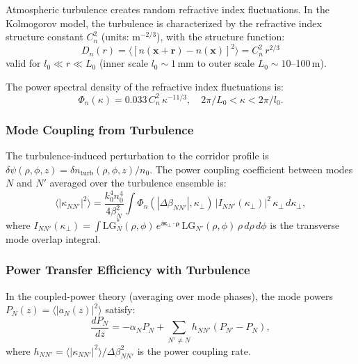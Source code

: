 \documentclass[journal,twocolumn]{IEEEtran}
\newcommand{\LG}{\mathrm{LG}}
\begin{document}
Atmospheric turbulence creates random refractive index fluctuations.
In the Kolmogorov model, the turbulence is characterized by the
refractive index structure constant $C_n^2$ (units: m$^{-2/3}$), with
the structure function:
\begin{equation}
D_n(r) = \langle[n(\mathbf{x}+\mathbf{r}) - n(\mathbf{x})]^2\rangle
= C_n^2\,r^{2/3}
\end{equation}
valid for $l_0 \ll r \ll L_0$ (inner scale $l_0 \sim 1$\,mm to outer
scale $L_0 \sim 10$--100\,m).

The power spectral density of the refractive index fluctuations is:
\begin{equation}
\Phi_n(\kappa) = 0.033\,C_n^2\,\kappa^{-11/3},
\quad 2\pi/L_0 < \kappa < 2\pi/l_0.
\end{equation}

\subsubsection{Mode Coupling from Turbulence}

The turbulence-induced perturbation to the corridor profile is
$\delta\psi(\rho,\phi,z) = \delta n_\text{turb}(\rho,\phi,z)/n_0$.
The power coupling coefficient between modes $N$ and $N'$ averaged
over the turbulence ensemble is:
\begin{equation}
\langle|\kappa_{NN'}|^2\rangle
= \frac{k_0^4 n_0^4}{4\beta_N^2}
\int \Phi_n(|\Delta\beta_{NN'}|,\kappa_\perp)\,
|I_{NN'}(\kappa_\perp)|^2\,\kappa_\perp\,d\kappa_\perp,
\label{eq:turb_coupling}
\end{equation}
where $I_{NN'}(\kappa_\perp) = \int \LG_N^*(\rho,\phi)\,
e^{i\mathbf{\kappa}_\perp\cdot\boldsymbol{\rho}}\,
\LG_{N'}(\rho,\phi)\,\rho\,d\rho\,d\phi$ is the transverse
mode overlap integral.

\subsubsection{Power Transfer Efficiency with Turbulence}

In the coupled-power theory (averaging over mode phases), the
mode powers $P_N(z) = \langle|a_N(z)|^2\rangle$ satisfy:
\begin{equation}
\frac{dP_N}{dz} = -\alpha_N P_N + \sum_{N'\neq N} h_{NN'}(P_{N'} - P_N),
\label{eq:coupled_power}
\end{equation}
where $h_{NN'} = \langle|\kappa_{NN'}|^2\rangle/\Delta\beta_{NN'}^2$ is the
power coupling rate.
\end{document}
